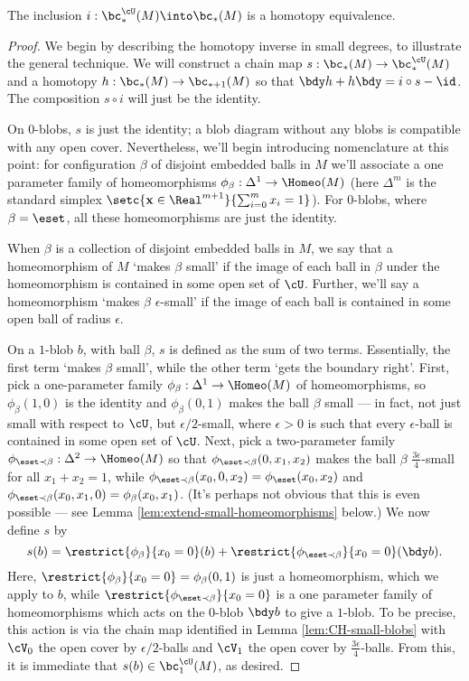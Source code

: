\begin{thm}
The inclusion $i: \bc^{\cU}_*(M) \into \bc_*(M)$ is a homotopy equivalence.
\end{thm}
\begin{proof}
We begin by describing the homotopy inverse in small degrees, to illustrate the general technique.
We will construct a chain map $s:  \bc_*(M) \to \bc^{\cU}_*(M)$ and a homotopy $h:\bc_*(M) \to \bc_{*+1}(M)$ so that $\bdy h+h \bdy=i\circ s - \id$. The composition $s \circ i$ will just be the identity.

On $0$-blobs, $s$ is just the identity; a blob diagram without any blobs is compatible with any open cover. Nevertheless, we'll begin introducing nomenclature at this point: for configuration $\beta$ of disjoint embedded balls in $M$ we'll associate a one parameter family of homeomorphisms $\phi_\beta : \Delta^1 \to \Homeo(M)$ (here $\Delta^m$ is the standard simplex $\setc{\mathbf{x} \in \Real^{m+1}}{\sum_{i=0}^m x_i = 1}$). For $0$-blobs, where $\beta = \eset$, all these homeomorphisms are just the identity.

When $\beta$ is a collection of disjoint embedded balls in $M$, we say that a homeomorphism of $M$ `makes $\beta$ small' if the image of each ball in $\beta$ under the homeomorphism is contained in some open set of $\cU$. Further, we'll say a homeomorphism `makes $\beta$ $\epsilon$-small' if the image of each ball is contained in some open ball of radius $\epsilon$.

On a $1$-blob $b$, with ball $\beta$, $s$ is defined as the sum of two terms. Essentially, the first term `makes $\beta$ small', while the other term `gets the boundary right'. First, pick a one-parameter family $\phi_\beta : \Delta^1 \to \Homeo(M)$ of homeomorphisms, so $\phi_\beta(1,0)$ is the identity and $\phi_\beta(0,1)$ makes the ball $\beta$ small --- in fact, not just small with respect to $\cU$, but $\epsilon/2$-small, where $\epsilon > 0$ is such that every $\epsilon$-ball is contained in some open set of $\cU$. Next, pick a two-parameter family $\phi_{\eset \prec \beta} : \Delta^2 \to \Homeo(M)$ so that $\phi_{\eset \prec \beta}(0,x_1,x_2)$ makes the ball $\beta$ $\frac{3\epsilon}{4}$-small for all $x_1+x_2=1$, while $\phi_{\eset \prec \beta}(x_0,0,x_2) = \phi_\eset(x_0,x_2)$ and $\phi_{\eset \prec \beta}(x_0,x_1,0) = \phi_\beta(x_0,x_1)$. (It's perhaps not obvious that this is even possible --- see Lemma \ref{lem:extend-small-homeomorphisms} below.) We now define $s$ by
$$s(b) = \restrict{\phi_\beta}{x_0=0}(b) + \restrict{\phi_{\eset \prec \beta}}{x_0=0}(\bdy b).$$
Here, $\restrict{\phi_\beta}{x_0=0} = \phi_\beta(0,1)$ is just a homeomorphism, which we apply to $b$, while $\restrict{\phi_{\eset \prec \beta}}{x_0=0}$ is a one parameter family of homeomorphisms which acts on the $0$-blob $\bdy b$ to give a $1$-blob. To be precise, this action is via the chain map identified in Lemma \ref{lem:CH-small-blobs} with $\cV_0$ the open cover by $\epsilon/2$-balls and $\cV_1$ the open cover by $\frac{3\epsilon}{4}$-balls. From this, it is immediate that $s(b) \in \bc^{\cU}_1(M)$, as desired.


\end{proof}
